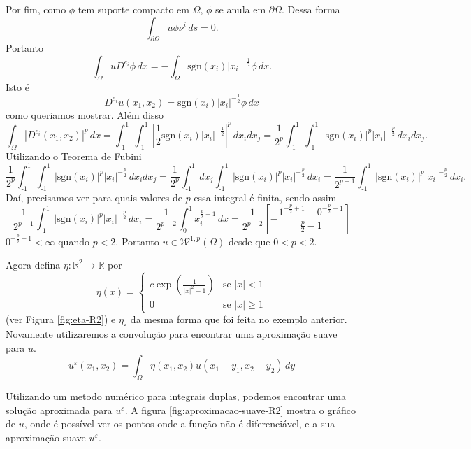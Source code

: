 \documentclass[a4paper, 11pt]{book}
\theoremstyle{definition}
\newcommand{\bR}{\mathbb{R}}
\newcommand{\cW}{\mathcal{W}}
\newcommand{\sgn}{\mathrm{sgn}}
\begin{document}
\begin{ex}
\[    \]
    Por fim, como $\phi$ tem suporte compacto em $\Omega$, $\phi$ se anula em $\partial\Omega$.
    Dessa forma
    \[
        \int_{\partial\Omega} u \phi \nu^i \,ds = 0.
    \]
    Portanto
    \[
        \int_\Omega  u D^{e_i} \phi \,dx = - \int_\Omega \sgn(x_i) |x_i|^{-\frac{1}{2}} \phi \,dx.
    \]
    Isto é
    \[
        D^{e_i} u(x_1,x_2) = \sgn(x_i) |x_i|^{-\frac{1}{2}} \phi \,dx
    \]
    como queriamos mostrar.
    Além disso
    \[
        \int_\Omega |D^{e_i} (x_1,x_2)|^p \, dx = \int_{\text{-}1}^1 \int_{\text{-}1}^1 \left| \frac{1}{2} \sgn(x_i) |x_i|^{-\frac{1}{2}} \right|^p \, dx_i dx_j = \frac{1}{2^p}\int_{\text{-}1}^1 \int_{\text{-}1}^1 |\sgn(x_i)|^p |x_i|^{-\frac{p}{2}} \,dx_i dx_j.
    \]
    Utilizando o Teorema de Fubini
    {\small
    \[
        \frac{1}{2^p}\int_{\text{-}1}^1\int_{\text{-}1}^1 |\sgn(x_i)|^p |x_i|^{-\frac{p}{2}} \,dx_i dx_j = \frac{1}{2^p}\int_{\text{-}1}^1 dx_j \int_{\text{-}1}^1 |\sgn(x_i)|^p |x_i|^{-\frac{p}{2}} \,dx_i = \frac{1}{2^{p-1}} \int_{\text{-}1}^1 |\sgn(x_i)|^p |x_i|^{-\frac{p}{2}} \,dx_i.
    \]}
    Daí, precisamos ver para quais valores de $p$ essa integral é finita, sendo assim
    \[
        \frac{1}{2^{p-1}} \int_{\text{-}1}^1 |\sgn(x_i)|^p |x_i|^{-\frac{p}{2}} \,dx_i = \frac{1}{2^{p-2}}\int_0^1 x_i^{\frac{p}{2}+1} \,dx = \frac{1}{2^{p-2}} \left[ -\frac{1^{-\frac{p}{2}+1} - 0^{-\frac{p}{2}+1}}{\tfrac{p}{2} - 1} \right]
    \]
    $0^{-\frac{p}{2} + 1} < \infty$ quando $p < 2$. Portanto $u \in \cW^{1,p}(\Omega)$ desde que $0 < p < 2$.

    Agora defina $\eta: \bR^2 \to \bR$ por
    \[
        \eta(x) = 
        \left\{ 
            \begin{array}{lr}
                c \exp\left(\frac{1}{|x|^2 - 1} \right) & \text{se } |x| < 1\\
                0 & \text{se } |x| \geqslant 1
            \end{array}
        \right.
    \]
    (ver Figura \ref{fig:eta-R2}) e $\eta_\varepsilon$ da mesma forma que foi feita no exemplo anterior. Novamente utilizaremos a convolução para encontrar uma aproximação suave para $u$.
    \[
        u^{\varepsilon}(x_1,x_2) = \int_\Omega \eta(x_1,x_2) u(x_1 - y_1, x_2 - y_2) \,dy
    \]

    Utilizando um metodo numérico para integrais duplas, podemos encontrar uma solução aproximada para $u^\varepsilon$.
    A figura \ref{fig:aproximacao-suave-R2} mostra o gráfico de $u$, onde é possível ver os pontos onde a função não é diferenciável, e a sua aproximação suave $u^\varepsilon$.


\end{ex}
\end{document}

